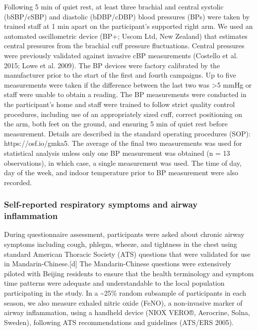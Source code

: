 \documentclass[
  letterpaper,
  DIV=11,
  numbers=noendperiod]{scrartcl}
\begin{document}
Following 5 min of quiet rest, at least three brachial and central
systolic (bSBP/cSBP) and diastolic (bDBP/cDBP) blood pressures (BPs)
were taken by trained staff at 1 min apart on the participant's
supported right arm. We used an automated oscillometric device (BP+;
Uscom Ltd, New Zealand) that estimates central pressures from the
brachial cuff pressure fluctuations. Central pressures were previously
validated against invasive cBP measurements (Costello et al. 2015; Lowe
et al. 2009). The BP devices were factory calibrated by the manufacturer
prior to the start of the first and fourth campaigns. Up to five
measurements were taken if the difference between the last two was
\textgreater5 mmHg or staff were unable to obtain a reading. The BP
measurements were conducted in the participant's home and staff were
trained to follow strict quality control procedures, including use of an
appropriately sized cuff, correct positioning on the arm, both feet on
the ground, and ensuring 5 min of quiet rest before measurement. Details
are described in the standard operating procedures (SOP):
https://osf.io/gmka5. The average of the final two measurements was used
for statistical analysis unless only one BP measurement was obtained (n
= 13 observations), in which case, a single measurement was used. The
time of day, day of the week, and indoor temperature prior to BP
measurement were also recorded.

\hypertarget{self-reported-respiratory-symptoms-and-airway-inflammation}{%
\subsubsection{Self-reported respiratory symptoms and airway
inflammation}\label{self-reported-respiratory-symptoms-and-airway-inflammation}}

During questionnaire assessment, participants were asked about chronic
airway symptoms including cough, phlegm, wheeze, and tightness in the
chest using standard American Thoracic Society (ATS) questions that were
validated for use in Mandarin-Chinese.{[}d{]} The Mandarin-Chinese
questions were extensively piloted with Beijing residents to ensure that
the health terminology and symptom time patterns were adequate and
understandable to the local population participating in the study. In a
\textasciitilde25\% random subsample of participants in each season, we
also measure exhaled nitric oxide (FeNO), a non-invasive marker of
airway inflammation, using a handheld device (NIOX VERO®, Aerocrine,
Solna, Sweden), following ATS recommendations and guidelines (ATS/ERS
2005).
\end{document}
